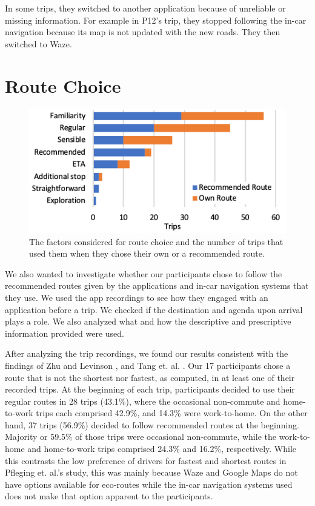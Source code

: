 In some trips, they switched to another application because of unreliable or missing information. For example in P12's trip, they stopped following the in-car navigation because its map is not updated with the new roads. They then switched to Waze.

\section{Route Choice}

\begin{figure}[h]
  \centering
  \vspace{-0.10cm}
  \centerline{\includegraphics{figures/s1-reason_route_choice.png}}
  \vspace{-0.30cm}
  \caption{The factors considered for route choice and the number of trips that used them when they chose their own or a recommended route.}
  \label{fig:s1-reason_route_choice}
\end{figure}

We also wanted to investigate whether our participants chose to follow the recommended routes given by the applications and in-car navigation systems that they use. We used the app recordings to see how they engaged with an application before a trip. We checked if the destination and agenda upon arrival plays a role. We also analyzed what and how the descriptive and prescriptive information provided were used. 

After analyzing the trip recordings, we found our results consistent with the findings of Zhu and Levinson \cite{Zhu2015DoPrinciple}, and Tang et. al. \cite{Tang2016AnalyzingData}. Our 17 participants chose a route that is not the shortest nor fastest, as computed, in at least one of their recorded trips. At the beginning of each trip, participants decided to use their regular routes in 28 trips (43.1\%), where the occasional non-commute and home-to-work trips each comprised 42.9\%, and 14.3\% were work-to-home. On the other hand, 37 trips (56.9\%) decided to follow recommended routes at the beginning. Majority or 59.5\% of those trips were occasional non-commute, while the work-to-home and home-to-work trips comprised 24.3\% and 16.2\%, respectively. While this contrasts the low preference of drivers for fastest and shortest routes in Pfleging et. al.'s \cite{Pfleging2014ExperienceNavigation} study, this was mainly because Waze and Google Maps do not have options available for eco-routes while the in-car navigation systems used does not make that option apparent to the participants.

